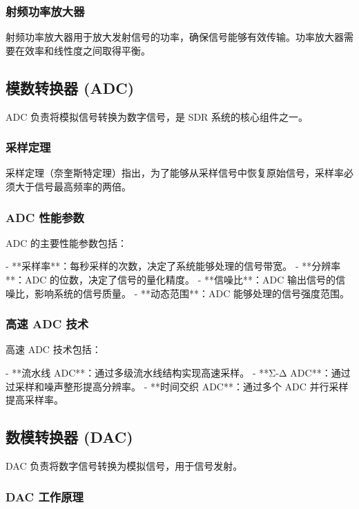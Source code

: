 \documentclass[UTF8]{ctexbook}
\begin{document}
\subsubsection{射频功率放大器}

射频功率放大器用于放大发射信号的功率，确保信号能够有效传输。功率放大器需要在效率和线性度之间取得平衡。

\subsection{模数转换器 (ADC)}

ADC 负责将模拟信号转换为数字信号，是 SDR 系统的核心组件之一。

\subsubsection{采样定理}

采样定理（奈奎斯特定理）指出，为了能够从采样信号中恢复原始信号，采样率必须大于信号最高频率的两倍。

\subsubsection{ADC 性能参数}

ADC 的主要性能参数包括：

- **采样率**：每秒采样的次数，决定了系统能够处理的信号带宽。
- **分辨率**：ADC 的位数，决定了信号的量化精度。
- **信噪比**：ADC 输出信号的信噪比，影响系统的信号质量。
- **动态范围**：ADC 能够处理的信号强度范围。

\subsubsection{高速 ADC 技术}

高速 ADC 技术包括：

- **流水线 ADC**：通过多级流水线结构实现高速采样。
- **Σ-Δ ADC**：通过过采样和噪声整形提高分辨率。
- **时间交织 ADC**：通过多个 ADC 并行采样提高采样率。

\subsection{数模转换器 (DAC)}

DAC 负责将数字信号转换为模拟信号，用于信号发射。

\subsubsection{DAC 工作原理}
\end{document}
